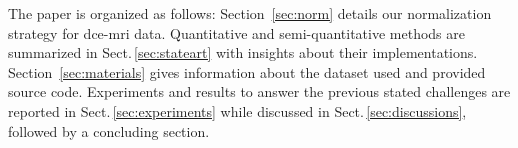 The paper is organized as follows:
Section~\ref{sec:norm} details our normalization strategy for \ac{dce}-\ac{mri} data.
Quantitative and semi-quantitative methods are summarized in Sect.\,\ref{sec:stateart} with insights about their implementations.
Section~\ref{sec:materials} gives information about the dataset used and provided source code.
Experiments and results to answer the previous stated challenges are reported in Sect.\,\ref{sec:experiments} while discussed in Sect.\,\ref{sec:discussions}, followed by a concluding section.

